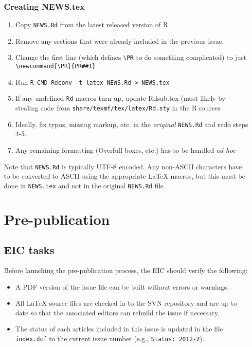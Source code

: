 \documentclass[11pt]{article}
\begin{document}
\subsubsection{Creating NEWS.tex}

\begin{enumerate}
\item Copy \texttt{NEWS.Rd} from the latest released version of R
\item Remove any sections that were already included in the previous issue.
\item Change the first line (which defines \verb+\PR+ to do something
complicated) to just \verb+\newcommand{\PR}{PR##1}+
\item Run \verb+R CMD Rdconv -t latex NEWS.Rd > NEWS.tex+
\item If any undefined \verb+Rd+ macros turn up, update Rdsub.tex (most likely
by stealing code from \verb+share/texmf/tex/latex/Rd.sty+ in the R sources
\item Ideally, fix typos, missing markup, etc. in the {\em original}
\texttt{NEWS.Rd} and redo steps 4-5.
\item Any remaining formatting (Overfull boxes, etc.) has to be
  handled {\em ad hoc}
\end{enumerate}
Note that \texttt{NEWS.Rd} is typically UTF-8 encoded.  Any non-ASCII
characters have to be converted to ASCII using the appropriate LaTeX
macros, but this must be done in \texttt{NEWS.tex} and not in the
original \texttt{NEWS.Rd} file.

\section{Pre-publication}

\subsection{EIC tasks}

Before launching the pre-publication process, the EIC should verify
the following:
\begin{itemize}
\item A PDF version of the issue file can be built without errors or
  warnings.
\item All LaTeX source files are checked in to the SVN repository and
  are up to date so that the associated editors can rebuild the issue
  if necessary.
\item The status of each articles included in this issue is updated in
  the file \texttt{index.dcf} to the current issue number (e.g.,
  \verb+Status: 2012-2+).
\end{itemize}
\end{document}
